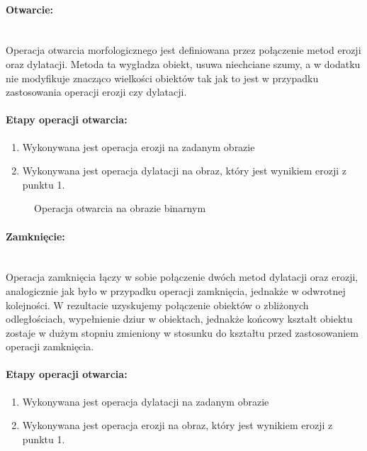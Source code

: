 \documentclass[a4paper,12pt,twoside,openany]{report}
\newcommand{\ImgPath}{.}
\begin{document}
\paragraph{Otwarcie:}\mbox{} \\
Operacja otwarcia morfologicznego jest definiowana przez połączenie metod erozji oraz dylatacji. Metoda ta wygładza obiekt, usuwa niechciane szumy, a w dodatku nie modyfikuje znacząco wielkości obiektów tak jak to jest w przypadku zastosowania operacji erozji czy dylatacji.

\paragraph{Etapy operacji otwarcia:}
\begin{enumerate}
	\item Wykonywana jest operacja erozji na zadanym obrazie
	\item Wykonywana jest operacja dylatacji na obraz, który jest wynikiem erozji z punktu 1.
\end{enumerate}

\begin{figure}[H]
	\centering
	\caption{Operacja otwarcia na obrazie binarnym}
\end{figure}

\paragraph{Zamknięcie:}\mbox{} \\
Operacja zamknięcia łączy w sobie połączenie dwóch metod dylatacji oraz erozji, analogicznie jak było w przypadku operacji zamknięcia, jednakże w odwrotnej kolejności. W rezultacie uzyskujemy połączenie obiektów o zbliżonych odległościach, wypełnienie dziur w obiektach, jednakże końcowy kształt obiektu zostaje w dużym stopniu zmieniony w stosunku do kształtu przed zastosowaniem operacji zamknięcia.

\paragraph{Etapy operacji otwarcia:}
\begin{enumerate}
	\item Wykonywana jest operacja dylatacji na zadanym obrazie
	\item Wykonywana jest operacja erozji na obraz, który jest wynikiem erozji z punktu 1.
\end{enumerate}
\end{document}
